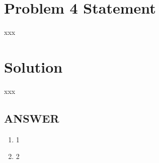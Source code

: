\section*{Problem 4 Statement}

xxx

\section*{Solution}

xxx

\vfill
\subsection*{ANSWER}
\begin{enumerate}
    \item 1
    \item 2
\end{enumerate}